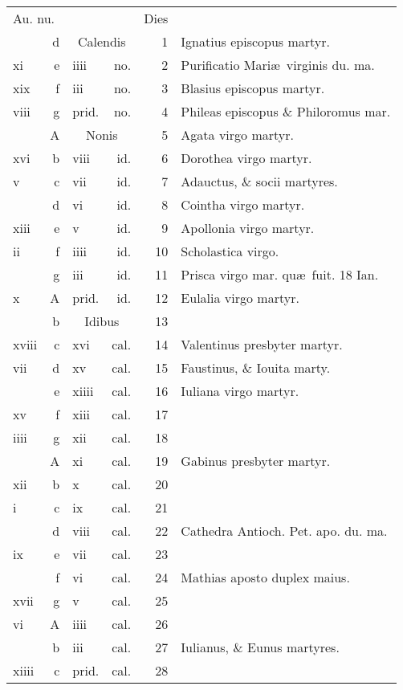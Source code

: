 \documentclass[a5paper,10pt]{book}
\begin{document}
\begin{center}
\begin{tabular}{l r l r r l}
\multicolumn{2}{l}{\color{red}Au. nu.} & & & \color{red} Dies & \\
 & d & \multicolumn{2}{c}{\color{red} Calendis} & 1 & Ignatius episcopus martyr. \color{black} \\
xi & e & iiii & no. & 2 & \color{red} Purificatio Mari\ae \ virginis du. ma. \color{black} \\
xix & f & iii & no. & 3 & Blasius episcopus martyr. \color{black} \\
viii & g & \color{red} prid. & \color{red} no. & 4 & Phileas episcopus \& Philoromus mar. \color{black} \\
 & \color{red} A & \multicolumn{2}{c}{\color{red} Nonis} & 5 & Agata virgo martyr. \color{black} \\
xvi & b & viii & id. & 6 & Dorothea virgo martyr. \color{black} \\
v & c & vii & id. & 7 & Adauctus, \& socii martyres. \color{black} \\
 & d & vi & id. & 8 & Cointha virgo martyr. \color{black} \\
xiii & e & v & id. & 9 & Apollonia virgo martyr. \color{black} \\
ii & f & iiii & id. & 10 & Scholastica virgo. \\%
 & g & iii & id. & 11 & Prisca virgo mar. \color{red} qu\ae \ fuit. 18 Ian. \color{black} \\%
x & \color{red} A & \color{red} prid. & \color{red} id. & 12 & Eulalia virgo martyr. \color{black} \\
 & b & \multicolumn{2}{c}{\color{red} Idibus} & 13 & \\
xviii & c & xvi & cal. & 14 & Valentinus presbyter martyr. \color{black} \\
vii & d & xv & cal. & 15 & Faustinus, \& Iouita marty. \color{black} \\
 & e & xiiii & cal. & 16 & Iuliana virgo martyr. \color{black} \\
xv & f & xiii & cal. & 17 & \\
iiii & g & xii & cal. & 18 & \\
 & \color{red} A & xi & cal. & 19 & Gabinus presbyter martyr. \color{black} \\
xii & b & x & cal. & 20 & \\
i & c & ix & cal. & 21 & \\
 & d & viii & cal. & 22 & \color{red} Cathedra Antioch. Pet. apo. du. ma. \color{black} \\
ix & e & vii & cal. & 23 & \\
 & f & vi & cal. & 24 & \color{red} Mathias aposto duplex maius. \color{black} \\
xvii & g & v & cal. & 25 & \\
vi & \color{red} A & iiii & cal. & 26 & \\
 & b & iii & cal. & 27 & Iulianus, \& Eunus martyres. \color{black} \\
xiiii & c & \color{red} prid. & \color{red} cal. & 28 & \\
\end{tabular}
\end{center}
\end{document}
